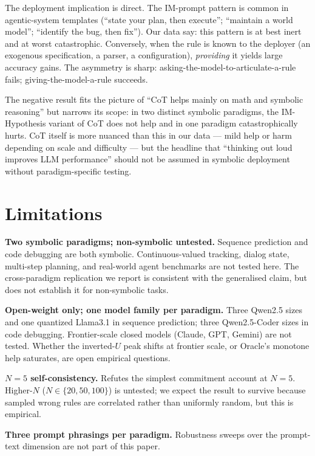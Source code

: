 \documentclass{article}
\begin{document}
The deployment implication is direct.  The IM-prompt pattern is
common in agentic-system templates (``state your plan, then
execute''; ``maintain a world model''; ``identify the bug, then
fix'').  Our data say:  this pattern is at best inert and at
worst catastrophic.  Conversely, when the rule is known to the
deployer (an exogenous specification, a parser, a configuration),
\emph{providing} it yields large accuracy gains.  The asymmetry
is sharp:  asking-the-model-to-articulate-a-rule fails;
giving-the-model-a-rule succeeds.

The negative result fits the \citet{sprague2024cot} picture of
``CoT helps mainly on math and symbolic reasoning'' but narrows
its scope:  in two distinct symbolic paradigms, the
IM-Hypothesis variant of CoT does not help and in one paradigm
catastrophically hurts.  CoT itself is more nuanced than this
in our data --- mild help or harm depending on scale and
difficulty --- but the headline that ``thinking out loud
improves LLM performance'' should not be assumed in symbolic
deployment without paradigm-specific testing.

\section{Limitations}
\label{sec:limits}

\textbf{Two symbolic paradigms; non-symbolic untested.}
Sequence prediction and code debugging are both symbolic.
Continuous-valued tracking, dialog state, multi-step planning,
and real-world agent benchmarks are not tested here.  The
cross-paradigm replication we report is consistent with the
generalised claim, but does not establish it for non-symbolic
tasks.

\textbf{Open-weight only; one model family per paradigm.}
Three Qwen2.5 sizes and one quantized Llama3.1 in sequence
prediction; three Qwen2.5-Coder sizes in code debugging.
Frontier-scale closed models (Claude, GPT, Gemini) are not
tested.  Whether the inverted-$U$ peak shifts at frontier scale,
or Oracle's monotone help saturates, are open empirical questions.

\textbf{$N = 5$ self-consistency.}  Refutes the simplest
commitment account at $N = 5$.  Higher-$N$ ($N \in
\{20, 50, 100\}$) is untested; we expect the result to survive
because sampled wrong rules are correlated rather than uniformly
random, but this is empirical.

\textbf{Three prompt phrasings per paradigm.}  Robustness sweeps
over the prompt-text dimension are not part of this paper.
\end{document}
